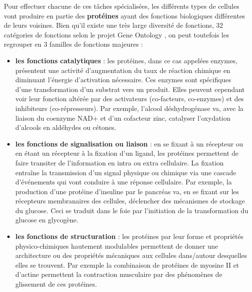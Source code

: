 Pour effectuer chacune de ces tâches spécialisées, les différents types de cellules vont produire en partie des \textbf{protéines} ayant des fonctions biologiques différentes de leurs voisines. Bien qu'il existe une très large diversité de fonctions, 32 catégories de fonctions selon le projet Gene Ontology \cite{Ashburner2000}, on peut toutefois les regrouper en 3 familles de fonctions majeures \cite{Mathews2012}:  
\begin{itemize}
    \item \textbf{les fonctions catalytiques} : les protéines, dans ce cas appelées enzymes, présentent une activité d'augmentation du taux de réaction chimique en diminuant l'énergie d'activation nécessaire. Ces enzymes sont spécifiques d'une transformation d'un substrat vers un produit. Elles peuvent cependant voir leur fonction altérée par des activateurs (co-facteurs, co-enzymes) et des inhibiteurs (co-répresseurs). Par exemple, l'alcool déshydrogénase va, avec la liaison du coenzyme NAD+ et d'un cofacteur zinc, catalyser l'oxydation d'alcools en aldéhydes ou cétones.
    \item \textbf{les fonctions de signalisation ou liaison} : en se fixant à un récepteur ou en étant un récepteur à la fixation d'un ligand, les protéines permettent de faire transiter de l'information en intra ou extra cellulaire. La fixation entraîne la transmission d'un signal physique ou chimique via une cascade d'événements qui vont conduire à une réponse cellulaire. Par exemple, la production d'une protéine d'insuline par le pancréas va, en se fixant sur les récepteurs membranaires des cellules, déclencher des mécanismes de stockage du glucose. Ceci se traduit dans le foie par l'initiation de la transformation du glucose en glycogène.
    \item \textbf{les fonctions de structuration} : les protéines par leur forme et propriétés physico-chimiques hautement modulables permettent de donner une architecture ou des propriétés mécaniques aux cellules dans/autour desquelles elles se trouvent. Par exemple la combinaison de protéines de myosine II et d'actine permettent la contraction musculaire par des phénomènes de glissement de ces protéines.
\end{itemize}



